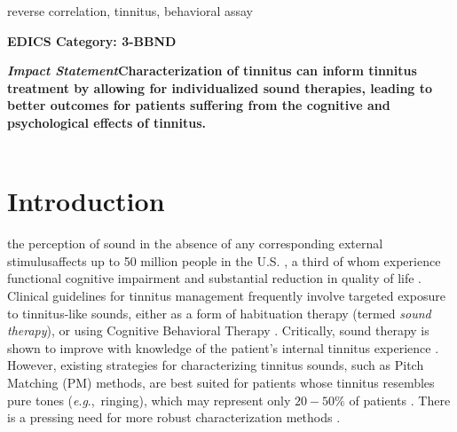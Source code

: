 \documentclass[journal]{IEEEtran}
\newcommand{\eg}{\textit{e}.\textit{g}.,\ }
\begin{document}
\begin{IEEEkeywords}
    reverse correlation, tinnitus, behavioral assay
\end{IEEEkeywords}

\ifCLASSOPTIONpeerreview
\begin{center} \bfseries EDICS Category: 3-BBND \end{center}
\fi
%
\IEEEpeerreviewmaketitle

\begin{minipage}[t]{0.9\columnwidth}
  \textbf{\textit{Impact Statement}\textemdash{}Characterization of tinnitus can inform tinnitus treatment by allowing for individualized sound therapies, leading to better outcomes for patients suffering from the cognitive and psychological effects of tinnitus.}\\
\\
\end{minipage}

\section{Introduction}
\textemdash{}the perception of sound
in the absence of any corresponding external stimulus\textemdash{}affects up to 50 million people in the U.S. \cite{bhattPrevalenceSeverityExposures2016,nationalinstituteondeafnessandothercommunicationdisordersQuickStatisticsHearing},
a third of whom experience functional cognitive impairment and substantial reduction in quality of life
\cite{ahmedImpactTinnitusPerception2017,nondahlImpactTinnitusQuality2007,tegg-quinnImpactTinnitusCognition2016}.
Clinical guidelines for tinnitus management frequently involve targeted exposure to tinnitus-like sounds, either as a form of habituation therapy (termed \textit{sound therapy}), or using Cognitive Behavioral Therapy \cite{tunkelClinicalPracticeGuideline2014}.
Critically, sound therapy is shown to improve with knowledge of the patient's internal tinnitus experience \cite{davisNeuromonicsTinnitusTreatment2007,landgrebeMethodologicalAspectsClinical2012,nickelOutcomeResearchMusic2005,okamotoListeningTailormadeNotched2010,schaetteAcousticStimulationTreatments2010,steinInhibitioninducedPlasticityTinnitus2015,tassCounteractingTinnitusAcoustic2012,wangStateArtSound2020}.
However, existing strategies for characterizing tinnitus sounds, such as Pitch Matching (PM) methods, are best suited for patients whose tinnitus resembles pure tones (\eg ringing), which may represent only $20-50\%$ of patients \cite{turnerjrAuditoryDysfunctionTinnitus1990,henryAuditoryTestResult2009,ukaegbeTinnitusItsEffect2017}.
There is a pressing need for more robust characterization methods \cite{henryTinnitusEpidemiologicPerspective2020,henryMeasurementTinnitus2016,norenaPsychoacousticCharacterizationTinnitus2002,robertsResidualInhibitionFunctions2006}.
\end{document}
